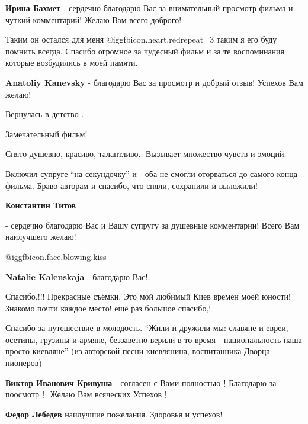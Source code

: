 \begin{itemize}
\textbf{Ирина Бахмет} - сердечно благодарю Вас за внимательный просмотр фильма и чуткий комментарий! Желаю Вам всего доброго!


Таким он остался для меня @igg{fbicon.heart.red}{repeat=3} таким я его буду
помнить всегда. Спасибо огромное за чудесный фильм и за те воспоминания которые
возбудились в моей памяти.

\textbf{Anatoliy Kanevsky} - благодарю Вас за просмотр и добрый отзыв! Успехов Вам желаю!

Вернулась в детство .


Замечательный фильм!

Снято душевно, красиво, талантливо.. Вызывает множество чувств и эмоций.

Включил супруге \enquote{на секундочку} и - оба не смогли оторваться до самого конца
фильма. Браво авторам и спасибо, что сняли, сохранили и выложили!


\textbf{Константин Титов} 

- сердечно благодарю Вас и Вашу супругу за душевные комментарии! Всего Вам
наилучшего желаю!

 @igg{fbicon.face.blowing.kiss} 

\textbf{Natalie Kalenskaja} - благодарю Вас!


Спасибо,!!! Прекрасные съёмки. Это мой любимый Киев времён моей юности!
Знакомо почти каждое место! ещё раз большое спасибо,!


Спасибо за путешествие в молодость. \enquote{Жили и дружили мы: славяне и евреи,
осетины, грузины и армяне, беззаветно верили в то время - национальность наша
просто киевляне} (из авторской песни киевлянина, воспитанника Дворца пионеров)

\begin{itemize} %
\textbf{Виктор Иванович Кривуша} - согласен с Вами полностью！Благодарю за поосмотр！ Желаю Вам всяческих Успехов！

\textbf{Федор Лебедев} наилучшие пожелания. Здоровья и успехов!
\end{itemize} %

\end{itemize} %
